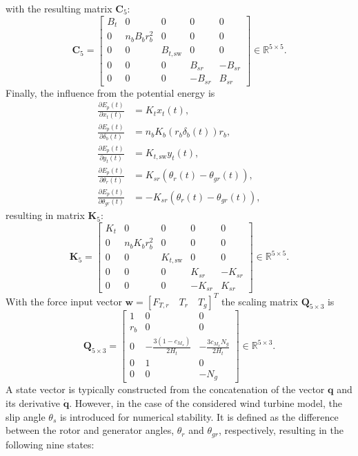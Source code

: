     with the resulting matrix \( \mathbf{C}_5 \):
    \[
    \mathbf{C}_5 = \begin{bmatrix}
        B_t & 0 & 0 & 0 & 0 \\
        0 & n_b B_b r_b^2 & 0 & 0 & 0 \\
        0 & 0 & B_{t,\text{sw}} & 0 & 0 \\
        0 & 0 & 0 & B_{sr} & -B_{sr} \\
        0 & 0 & 0 & -B_{sr} & B_{sr}
    \end{bmatrix}  \in \mathbb{R}^{5 \times 5}.
    \]
    Finally, the influence from the potential energy is
    \begin{align*}
        \frac{\partial E_p(t)}{\partial x_t(t) } &= K_t x_t(t), \\
        \frac{\partial E_p(t)}{\partial \delta_b(t) } &= n_b K_b(r_b \delta_b(t)) r_b, \\
        \frac{\partial E_p(t)}{\partial y_t(t) } &= K_{t,\text{sw}} y_t(t), \\
        \frac{\partial E_p(t)}{\partial \theta_r(t) } &= K_{sr}(\theta_r(t) - \theta_{gr}(t)), \\
        \frac{\partial E_p(t)}{\partial \theta_{gr}(t) } &= -K_{sr}(\theta_r(t) - \theta_{gr}(t)),
    \end{align*}
    resulting in matrix \(\mathbf{K}_5\):
    \[
    \mathbf{K}_5 = \begin{bmatrix}
        K_t & 0 & 0 & 0 & 0 \\
        0 & n_b K_b r_b^2 & 0 & 0 & 0 \\
        0 & 0 & K_{t,\text{sw}} & 0 & 0 \\
        0 & 0 & 0 & K_{sr} & -K_{sr} \\
        0 & 0 & 0 & -K_{sr} & K_{sr}
    \end{bmatrix}  \in \mathbb{R}^{5 \times 5}.
    \]
    With the force input vector \(\bm{w}=  [F_{T,r} \quad T_r \quad T_{g} ]^T\) the scaling matrix \(\mathbf{Q}_{5\times3}\) is
    \[
    \mathbf{Q}_{5\times3} = \begin{bmatrix}
        1 & 0 & 0  \\
        r_b & 0 & 0  \\
        0 & -\frac{3(1-c_{M_x})}{2H_t} & -\frac{3c_{M_x}N_g}{2H_t}\\
        0 & 1 & 0 \\
        0 & 0 & -N_g
    \end{bmatrix} \in \mathbb{R}^{5 \times 3}.
    \]
    A state vector is typically constructed from the concatenation of the vector \(\bm{q}\) and its derivative \(\dot{\bm{q}}\). However, in the case of the considered wind turbine model, the slip angle \(\theta_s\) is introduced for numerical stability. It is defined as the difference between the rotor and generator angles, \(\theta_r\) and \(\theta_{gr}\), respectively, resulting in the following nine states:
